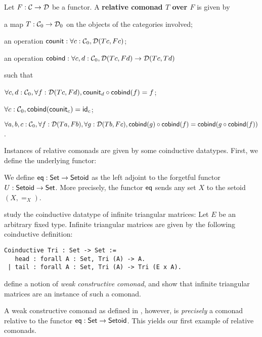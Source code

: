 \documentclass{amsart}
\newcommand{\fat}[1]{\textbf{#1}}
\begin{document}
\begin{definition}
  Let $F:\C\to\D$ be a functor. A \fat{relative comonad $T$ over $F$} is given by
  \begin{packitem}
   \item a map $T:\C_0 \to \D_0$ on the objects of the categories involved;
   \item an operation $\counit : \forall c : \C_0, \D(Tc,Fc)$;
   \item an operation $\cobind: \forall c,d:\C_0, \D(Tc,Fd) \to \D(Tc,Td)$
  \end{packitem}
  such that 
  \begin{packitem}
   \item $\forall c,d:\C_0, \forall f:\D(Tc,Fd), \comp{\cobind(f)}{\counit_d} = f$;
   \item $\forall c : \C_0, \cobind(\counit_c) = \id_c$;
   \item $\forall a,b,c:\C_0, \forall f : \D(Ta,Fb),\forall g:\D(Tb,Fc), \\
        \comp{\cobind(f)}{\cobind(g)} = \cobind(\comp{\cobind(f)}{g})$.
  \end{packitem} 
\end{definition}

Instances of relative comonads are given by some coinductive datatypes.
First, we define the underlying functor:

\begin{definition}\label{def:eq}
 We define $\eq : \Set\to\Setoid$ as the left adjoint to the forgetful functor 
  $U : \Setoid \to \Set$.
  More precisely, the functor $\eq$ sends any set $X$ to the setoid $(X,=_X)$.
\end{definition}


\begin{example}\label{ex:tri_comonad}
  \textcite{DBLP:conf/types/MatthesP11} study the coinductive datatype of infinite triangular matrices:
Let $E$ be an arbitrary fixed type.
   Infinite triangular matrices are given by the following coinductive definition: 
  \begin{lstlisting}
Coinductive Tri : Set -> Set :=
   head : forall A : Set, Tri (A) -> A.
 | tail : forall A : Set, Tri (A) -> Tri (E x A).
  \end{lstlisting}
%
  \textcite{DBLP:conf/types/MatthesP11} define a notion of \emph{weak constructive comonad}, and show that infinite triangular matrices
  are an instance of such a comonad.
   
  A weak constructive comonad as defined in \parencite{DBLP:conf/types/MatthesP11}, however, is \emph{precisely}
  a comonad relative to the functor $\eq : \Set\to\Setoid$.
  This yields our first example of relative comonads. 
\end{example}
\end{document}
